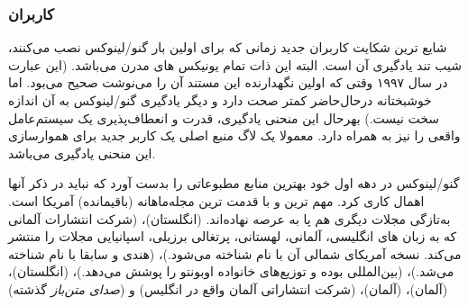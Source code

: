 \subsubsection{کاربران}

شایع ترین شکایت کاربران جدید زمانی که برای اولین بار
گنو/لینوکس نصب می‌کنند، شیب تند یادگیری آن است.
البته این ذات تمام یونیکس های مدرن می‌باشد.
(این عبارت در سال ۱۹۹۷ وقتی که اولین نگهدارنده این
مستند آن را می‌نوشت صحیح می‌بود. اما خوشبختانه درحال‌حاضر
کمتر صحت دارد و دیگر یادگیری گنو/لینوکس به آن اندازه سخت نیست.)
بهرحال این منحنی یادگیری، قدرت و انعطاف‌پذیری
یک سیستم‌عامل واقعی را نیز به همراه دارد.
معمولا یک لاگ منبع اصلی یک کاربر جدید برای هموارسازی
این منحنی یادگیری می‌باشد.

گنو/لینوکس در دهه اول خود بهترین منابع مطبوعاتی را بدست آورد
که نباید در ذکر آنها اهمال کاری کرد.
مهم ترین و با قدمت ترین مجله‌ماهانه (باقیمانده) آمریکا
است. به‌تازگی مجلات دیگری هم پا به عرصه نهاده‌اند.
‌(انگلستان)،
(شرکت انتشارات آلمانی که به زبان های انگلیسی،
آلمانی، لهستانی، پرتغالی برزیلی، اسپانیایی
مجلات را منتشر می‌کند. نسخه آمریکای شمالی آن
با نام
شناخته می‌شود.)،
(هندی و سابقا با نام
شناخته می‌شد.)،
(بین‌المللی بوده و توزیع‌های خانواده اوبونتو را پوشش می‌دهد.)،
(انگلستان)،
(آلمان)،
(آلمان)،
(شرکت انتشاراتی آلمان واقع در انگلیس)
و
({\itshape صدای متن‌باز} گذشته)

